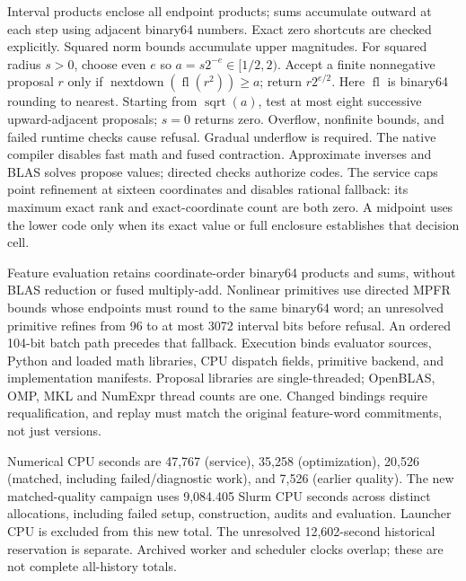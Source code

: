 \documentclass[11pt,a4paper]{article}
\makeatletter
\def\paragraph{\@startsection{paragraph}{4}{\z@}{1.5ex plus
   0.5ex minus .2ex}{-1em}{\normalsize\bf}}
\makeatother
\begin{document}
\paragraph{Executable arithmetic.}
Interval products enclose all endpoint products; sums accumulate outward at each
step using adjacent binary64 numbers. Exact zero shortcuts are checked explicitly.
Squared norm bounds accumulate upper magnitudes. For squared radius $s>0$,
choose even $e$ so $a=s2^{-e}\in[1/2,2)$. Accept a finite nonnegative proposal
$r$ only if $\operatorname{nextdown}(\operatorname{fl}(r^2))\geq a$; return
$r2^{e/2}$. Here $\operatorname{fl}$ is binary64 rounding to nearest. Starting
from $\operatorname{sqrt}(a)$, test at most eight successive upward-adjacent
proposals; $s=0$ returns zero. Overflow, nonfinite
bounds, and failed runtime checks cause refusal. Gradual underflow is required.
The native compiler disables fast math and fused contraction. Approximate
inverses and BLAS solves propose values; directed checks authorize codes.
The service caps point refinement at sixteen coordinates and disables rational
fallback: its maximum exact rank and exact-coordinate count are both zero. A midpoint uses the lower code
only when its exact value or full enclosure establishes that decision cell.

Feature evaluation retains coordinate-order binary64 products and sums, without
BLAS reduction or fused multiply-add. Nonlinear primitives use directed MPFR
bounds whose endpoints must round to the same binary64 word; an unresolved
primitive refines from 96 to at most 3072 interval bits before refusal. An ordered
104-bit batch path precedes that fallback. Execution binds evaluator sources,
Python and loaded math libraries, CPU dispatch fields, primitive backend, and
implementation manifests. Proposal libraries are single-threaded; OpenBLAS, OMP,
MKL and NumExpr thread counts are one. Changed bindings require requalification,
and replay must match the original feature-word commitments, not just versions.

Numerical CPU seconds are 47,767 (service), 35,258 (optimization), 20,526
(matched, including failed/diagnostic work), and 7,526 (earlier quality). The new
matched-quality campaign uses 9,084.405 Slurm CPU seconds across distinct
allocations, including failed setup, construction, audits and evaluation. Launcher
CPU is excluded from this new total. The unresolved
12,602-second historical reservation is separate. Archived worker and scheduler
clocks overlap; these are not complete all-history totals.
\end{document}
